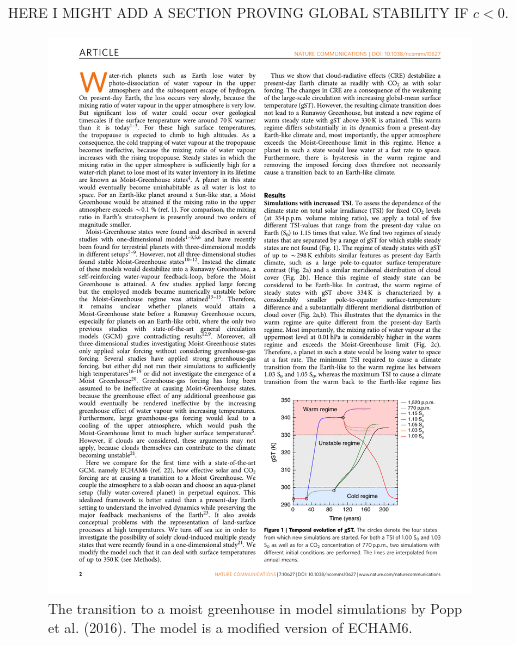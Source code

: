 \documentclass[12pt]{book}
\begin{document}
\vspace{0.5 cm}

HERE I MIGHT ADD A SECTION PROVING GLOBAL STABILITY IF $c<0$. 


\begin{figure}
\begin{center}
\includegraphics[width=11 cm]{../external_figures/Popp_etal_2016_instability.pdf}
\end{center}
\caption{ The transition to a moist greenhouse in model simulations by Popp et al. (2016). The model is a modified version of ECHAM6.  } 
\label{fig:popp}
\end{figure}
\end{document}
